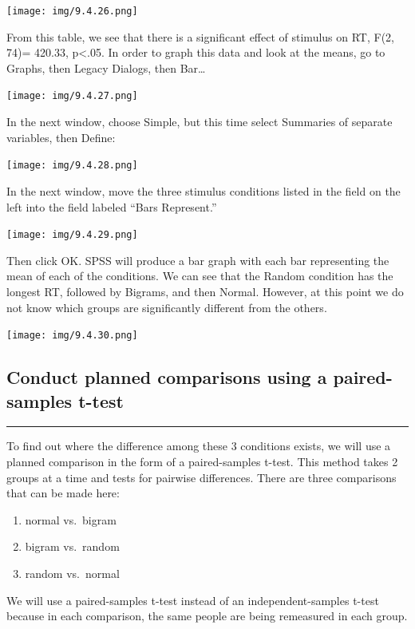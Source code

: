 \documentclass[
]{book}
\providecommand{\tightlist}{%
  \setlength{\itemsep}{0pt}\setlength{\parskip}{0pt}}
\begin{document}
\texttt{[image: img/9.4.26.png]}

From this table, we see that there is a significant effect of stimulus on RT, F(2, 74)= 420.33, p\textless.05. In order to graph this data and look at the means, go to {Graphs}, then {Legacy Dialogs}, then {Bar\ldots{}}

\texttt{[image: img/9.4.27.png]}

In the next window, choose {Simple}, but this time select {Summaries of separate variables}, then {Define}:

\texttt{[image: img/9.4.28.png]}

In the next window, move the three stimulus conditions listed in the field on the left into the field labeled ``Bars Represent.''

\texttt{[image: img/9.4.29.png]}

Then click {OK}. SPSS will produce a bar graph with each bar representing the mean of each of the conditions. We can see that the Random condition has the longest RT, followed by Bigrams, and then Normal. However, at this point we do not know which groups are significantly different from the others.

\texttt{[image: img/9.4.30.png]}

\hypertarget{conduct-planned-comparisons-using-a-paired-samples-t-test}{%
\subsection{Conduct planned comparisons using a paired-samples t-test}\label{conduct-planned-comparisons-using-a-paired-samples-t-test}}

\begin{center}\rule{0.5\linewidth}{0.5pt}\end{center}

To find out where the difference among these 3 conditions exists, we will use a planned comparison in the form of a paired-samples t-test. This method takes 2 groups at a time and tests for pairwise differences. There are three comparisons that can be made here:

\begin{enumerate}
\def\labelenumi{\arabic{enumi}.}
\tightlist
\item
  normal vs.~bigram
\item
  bigram vs.~random
\item
  random vs.~normal
\end{enumerate}

We will use a paired-samples t-test instead of an independent-samples t-test because in each comparison, the same people are being remeasured in each group.
\end{document}
